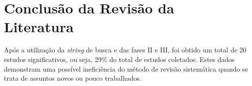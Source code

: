 \section{Conclusão da Revisão da Literatura}
\quad Após a utilização da \textit{string} de busca e das fases II e III, foi obtido um total de 20 estudos significativos,
ou seja, 29\% do total de estudos coletados. Estes dados demonstram uma possível ineficiência do método
de revisão sistemática quando se trata de assuntos novos ou pouco trabalhados.




